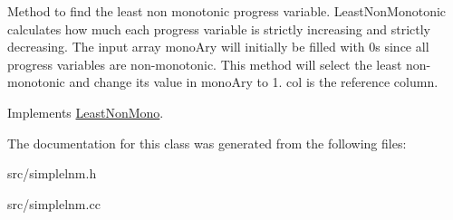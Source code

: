 Method to find the least non monotonic progress variable. LeastNonMonotonic calculates how much each progress variable is strictly increasing and strictly decreasing. The input array monoAry will initially be filled with 0s since all progress variables are non-\/monotonic. This method will select the least non-\/monotonic and change its value in monoAry to 1. col is the reference column. 

Implements \hyperlink{classLeastNonMono}{LeastNonMono}.

The documentation for this class was generated from the following files:\begin{DoxyCompactItemize}
\item 
src/simplelnm.h\item 
src/simplelnm.cc\end{DoxyCompactItemize}
